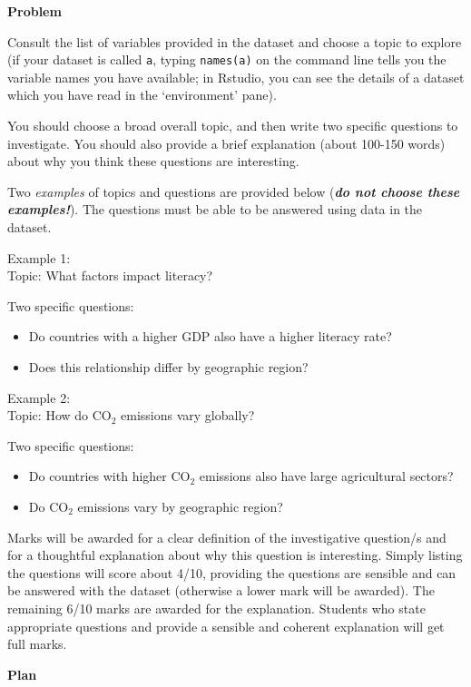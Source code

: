\documentclass[11pt]{exam}
\begin{document}
\begin{questions}
\question[10]  \textbf{Problem} \droptotalpoints

Consult the list of variables provided in the dataset and choose a
topic to explore (if your dataset is called \verb+a+, typing
\verb+names(a)+ on the command line tells you the variable names you
have available; in Rstudio, you can see the details of a dataset which
you have read in the `environment' pane).

You should choose a broad overall topic, and then
write two specific questions to investigate.  You should also
provide a brief explanation (about 100-150 words) about why you think
these questions are interesting.

Two \emph{examples} of topics and questions are provided below
({\bf\em do not choose these examples!}).  The questions must be able
to be answered using data in the dataset.

Example 1: \\
Topic: What factors impact literacy?

Two specific questions:
\begin{itemize}
\item Do countries with a higher GDP also have a higher literacy rate? 
\item Does this relationship differ by geographic region? 
\end{itemize}

Example 2: \\
Topic: How do CO$_2$ emissions vary globally?

Two specific questions:
\begin{itemize}
\item Do countries with higher CO$_2$ emissions also have large agricultural sectors?
\item Do CO$_2$ emissions vary by geographic region? 
\end{itemize}

Marks will be awarded for a clear definition of the investigative
question/s and for a thoughtful explanation about why this question is
interesting.  Simply listing the questions will score about 4/10,
providing the questions are sensible and can be answered with the
dataset (otherwise a lower mark will be awarded).  The remaining 6/10
marks are awarded for the explanation.  Students who state appropriate
questions and provide a sensible and coherent explanation will get
full marks.

\question[5] \textbf{Plan} \droptotalpoints


\end{questions}
\end{document}
